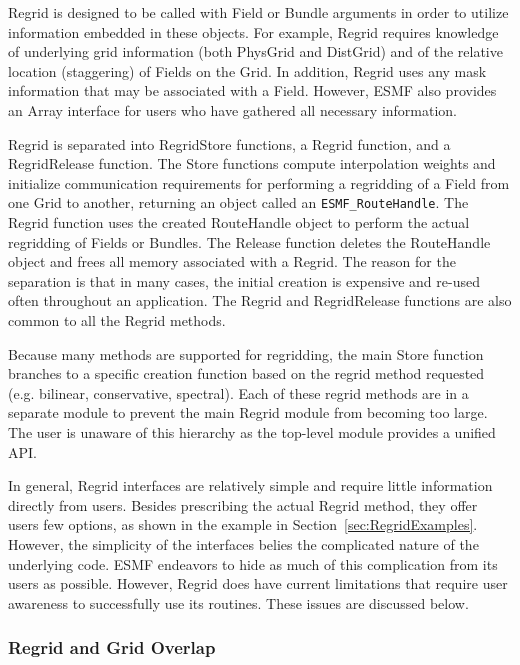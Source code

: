 

Regrid is designed to be called with Field or Bundle
arguments in order to utilize information embedded in
these objects.  For example, Regrid requires knowledge
of underlying grid information (both PhysGrid and DistGrid)
and of the relative location (staggering) of Fields on
the Grid.  In addition, Regrid uses any mask information
that may be associated with a Field.  However, ESMF also
provides an Array interface for users who have gathered all
necessary information.

Regrid is separated into RegridStore functions, a Regrid
function, and a RegridRelease function. The Store functions
compute interpolation weights and initialize communication
requirements for performing a regridding of a Field
from one Grid to another, returning an object called an
{\tt ESMF\_RouteHandle}.  The Regrid function uses
the created RouteHandle object to perform the actual regridding
of Fields or Bundles.  The Release function deletes the
RouteHandle object and frees all memory associated with a Regrid.
The reason for the separation is that in many cases, the
initial creation is expensive and re-used often throughout
an application.  The Regrid and RegridRelease functions are
also common to all the Regrid methods.

Because many methods are supported for regridding,
the main Store function branches to a specific
creation function based on the regrid method requested
(e.g. bilinear, conservative, spectral).  Each of
these regrid methods are in a separate module to
prevent the main Regrid module from becoming too
large.  The user is unaware of this hierarchy as the
top-level module provides a unified API.

In general, Regrid interfaces are relatively simple and require little
information directly from users.  Besides prescribing the actual Regrid method,
they offer users few options, as shown in the example in
Section~\ref{sec:RegridExamples}.  However, the simplicity of the interfaces
belies the complicated nature of the underlying code.  ESMF endeavors to hide as
much of this complication from its users as possible.  However, Regrid does have
current limitations that require user awareness to successfully use its
routines.  These issues are discussed below.

\subsubsection{Regrid and Grid Overlap}

